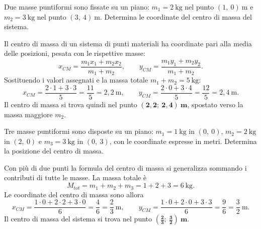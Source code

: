 \begin{question}[ID=1.1, subtitle={Centro di massa di due masse puntiformi}, tags={corpo rigido, centro di massa}, difficulty=facile]
Due masse puntiformi sono fissate su un piano: $m_1 = 2\ \text{kg}$ nel punto $(1,\ 0)\ \text{m}$ e $m_2 = 3\ \text{kg}$ nel punto $(3,\ 4)\ \text{m}$. Determina le coordinate del centro di massa del sistema.
\begin{solution}
Il centro di massa di un sistema di punti materiali ha coordinate pari alla media delle posizioni, pesata con le rispettive masse:
\[
x_{CM} = \frac{m_1 x_1 + m_2 x_2}{m_1 + m_2}, \qquad
y_{CM} = \frac{m_1 y_1 + m_2 y_2}{m_1 + m_2}.
\]
Sostituendo i valori assegnati e la massa totale $m_1 + m_2 = 5\ \text{kg}$:
\[
x_{CM} = \frac{2\cdot 1 + 3\cdot 3}{5} = \frac{11}{5} = 2{,}2\ \text{m}, \qquad
y_{CM} = \frac{2\cdot 0 + 3\cdot 4}{5} = \frac{12}{5} = 2{,}4\ \text{m}.
\]
Il centro di massa si trova quindi nel punto $\mathbf{(2{,}2;\ 2{,}4)\ \text{m}}$, spostato verso la massa maggiore $m_2$.
\end{solution}
\end{question}


\begin{question}[ID=1.2, subtitle={Centro di massa di tre masse su un piano}, tags={corpo rigido, centro di massa}, difficulty=facile]
Tre masse puntiformi sono disposte su un piano: $m_1 = 1\ \text{kg}$ in $(0,\ 0)$, $m_2 = 2\ \text{kg}$ in $(2,\ 0)$ e $m_3 = 3\ \text{kg}$ in $(0,\ 3)$, con le coordinate espresse in metri. Determina la posizione del centro di massa.
\begin{solution}
Con più di due punti la formula del centro di massa si generalizza sommando i contributi di tutte le masse. La massa totale è
\[
M_{tot} = m_1 + m_2 + m_3 = 1 + 2 + 3 = 6\ \text{kg}.
\]
Le coordinate del centro di massa sono allora
\[
x_{CM} = \frac{1\cdot 0 + 2\cdot 2 + 3\cdot 0}{6} = \frac{4}{6} = \frac{2}{3}\ \text{m}, \qquad
y_{CM} = \frac{1\cdot 0 + 2\cdot 0 + 3\cdot 3}{6} = \frac{9}{6} = \frac{3}{2}\ \text{m}.
\]
Il centro di massa del sistema si trova nel punto $\mathbf{\left(\tfrac{2}{3};\ \tfrac{3}{2}\right)\ \text{m}}$.
\end{solution}
\end{question}


